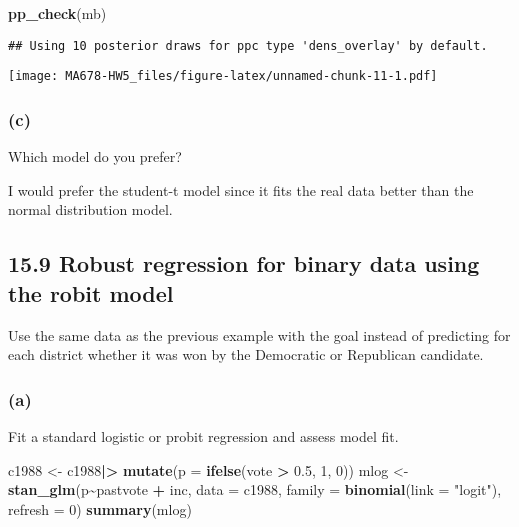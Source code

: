 \documentclass[
]{article}
\newenvironment{Shaded}{\begin{snugshade}}{\end{snugshade}}
\newcommand{\AttributeTok}[1]{\textcolor[rgb]{0.13,0.29,0.53}{#1}}
\newcommand{\DecValTok}[1]{\textcolor[rgb]{0.00,0.00,0.81}{#1}}
\newcommand{\FloatTok}[1]{\textcolor[rgb]{0.00,0.00,0.81}{#1}}
\newcommand{\FunctionTok}[1]{\textcolor[rgb]{0.13,0.29,0.53}{\textbf{#1}}}
\newcommand{\NormalTok}[1]{#1}
\newcommand{\OtherTok}[1]{\textcolor[rgb]{0.56,0.35,0.01}{#1}}
\newcommand{\SpecialCharTok}[1]{\textcolor[rgb]{0.81,0.36,0.00}{\textbf{#1}}}
\newcommand{\StringTok}[1]{\textcolor[rgb]{0.31,0.60,0.02}{#1}}
\begin{document}
\begin{Shaded}
\begin{Highlighting}[]
\FunctionTok{pp\_check}\NormalTok{(mb)}
\end{Highlighting}
\end{Shaded}

\begin{verbatim}
## Using 10 posterior draws for ppc type 'dens_overlay' by default.
\end{verbatim}

\texttt{[image: MA678-HW5\_files/figure-latex/unnamed-chunk-11-1.pdf]}

\hypertarget{c-1}{%
\subsubsection{(c)}\label{c-1}}

Which model do you prefer?

I would prefer the student-t model since it fits the real data better
than the normal distribution model.

\hypertarget{robust-regression-for-binary-data-using-the-robit-model}{%
\subsection{15.9 Robust regression for binary data using the robit
model}\label{robust-regression-for-binary-data-using-the-robit-model}}

Use the same data as the previous example with the goal instead of
predicting for each district whether it was won by the Democratic or
Republican candidate.

\hypertarget{a-3}{%
\subsubsection{(a)}\label{a-3}}

Fit a standard logistic or probit regression and assess model fit.

\begin{Shaded}
\begin{Highlighting}[]
\NormalTok{c1988 }\OtherTok{\textless{}{-}}\NormalTok{ c1988}\SpecialCharTok{|\textgreater{}}
    \FunctionTok{mutate}\NormalTok{(}\AttributeTok{p =} \FunctionTok{ifelse}\NormalTok{(vote }\SpecialCharTok{\textgreater{}} \FloatTok{0.5}\NormalTok{, }\DecValTok{1}\NormalTok{, }\DecValTok{0}\NormalTok{))}
\NormalTok{mlog }\OtherTok{\textless{}{-}} \FunctionTok{stan\_glm}\NormalTok{(p}\SpecialCharTok{\textasciitilde{}}\NormalTok{pastvote }\SpecialCharTok{+}\NormalTok{ inc, }\AttributeTok{data =}\NormalTok{ c1988, }\AttributeTok{family =} \FunctionTok{binomial}\NormalTok{(}\AttributeTok{link =} \StringTok{"logit"}\NormalTok{), }\AttributeTok{refresh =} \DecValTok{0}\NormalTok{)}
\FunctionTok{summary}\NormalTok{(mlog)}
\end{Highlighting}
\end{Shaded}
\end{document}
